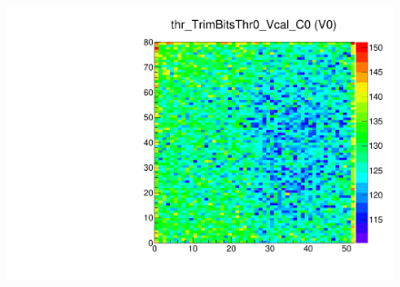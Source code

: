 


\begin{figure}[!Hp]
\centering
\begin{minipage}{0.45\textwidth}
  \includegraphics[width=1.0\textwidth]{figures/trim_thr_TrimBitsThr0_Vcal.pdf}
  \caption{}
  \label{fig:trim_thr_TrimBitsThr0_Vcal}
\end{minipage}
\end{figure}



